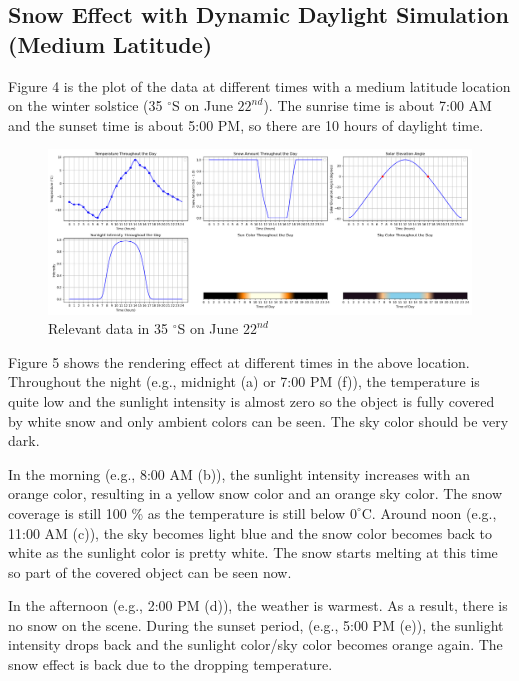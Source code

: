\documentclass{article}
\begin{document}
\subsection {Snow Effect with Dynamic Daylight Simulation (Medium Latitude)}

Figure 4 is the plot of the data at different times with a medium latitude location on the winter solstice (35 $^{\circ}$S on June 
\(22^{nd}\)). The sunrise time is about 7:00 AM and the sunset time is about 5:00 PM, so there are 10 hours of daylight time.

\begin{figure}[h]
  \centering
  \begin{minipage}{1.00\textwidth}
      \centering
      \includegraphics[width=\textwidth]{images/Plot35N.png}
      \caption{Relevant data in 35 $^{\circ}$S on June \(22^{nd}\)}
      \label{fig:Plot35N}
  \end{minipage}
\end{figure}

Figure 5 shows the rendering effect at different times in the above location. Throughout the night (e.g., midnight (a) or 7:00 PM (f)), 
the temperature is quite low and the sunlight intensity is almost zero so the object is fully covered by white snow and only ambient 
colors can be seen. The sky color should be very dark.

In the morning (e.g., 8:00 AM (b)), the sunlight intensity increases with an orange color, resulting in a yellow snow color and an 
orange sky color. The snow coverage is still 100 \% as the temperature is still below \(0^\circ\mathrm{C}\). Around noon (e.g., 11:00 
AM (c)), the sky becomes light blue and the snow color becomes back to white as the sunlight color is pretty white. The snow starts 
melting at this time so part of the covered object can be seen now. 

In the afternoon (e.g., 2:00 PM (d)), the weather is warmest. As a result, there is no snow on the scene. During the sunset period, 
(e.g., 5:00 PM (e)), the sunlight intensity drops back and the sunlight color/sky color becomes orange again. The snow effect is back 
due to the dropping temperature.
\end{document}
